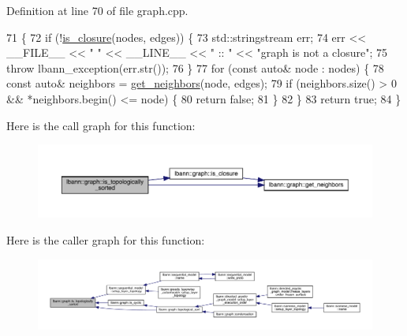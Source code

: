 Definition at line 70 of file graph.\+cpp.


\begin{DoxyCode}
71                                                                    \{
72   \textcolor{keywordflow}{if} (!\hyperlink{namespacelbann_1_1graph_ac9c1819b38f8bc514ab24ac8778f840b}{is\_closure}(nodes, edges)) \{
73     std::stringstream err;
74     err << \_\_FILE\_\_ << \textcolor{stringliteral}{" "} << \_\_LINE\_\_ << \textcolor{stringliteral}{" :: "} << \textcolor{stringliteral}{"graph is not a closure"};
75     \textcolor{keywordflow}{throw} lbann\_exception(err.str());
76   \}
77   \textcolor{keywordflow}{for} (\textcolor{keyword}{const} \textcolor{keyword}{auto}& node : nodes) \{
78     \textcolor{keyword}{const} \textcolor{keyword}{auto}& neighbors = \hyperlink{namespacelbann_1_1graph_ad305e0d104d25d9cb1e63a4b93c0847c}{get\_neighbors}(node, edges);
79     \textcolor{keywordflow}{if} (neighbors.size() > 0 && *neighbors.begin() <= node) \{
80       \textcolor{keywordflow}{return} \textcolor{keyword}{false};
81     \}
82   \}
83   \textcolor{keywordflow}{return} \textcolor{keyword}{true};
84 \}
\end{DoxyCode}
Here is the call graph for this function\+:\nopagebreak
\begin{figure}[H]
\begin{center}
\leavevmode
\includegraphics[width=350pt]{namespacelbann_1_1graph_a0dd9dcef8bc13481677692347530e328_cgraph}
\end{center}
\end{figure}
Here is the caller graph for this function\+:\nopagebreak
\begin{figure}[H]
\begin{center}
\leavevmode
\includegraphics[width=350pt]{namespacelbann_1_1graph_a0dd9dcef8bc13481677692347530e328_icgraph}
\end{center}
\end{figure}
\mbox{\label{namespacelbann_1_1graph_a956e9f6f1b842a2ffe5bda9015bbb906}} 
